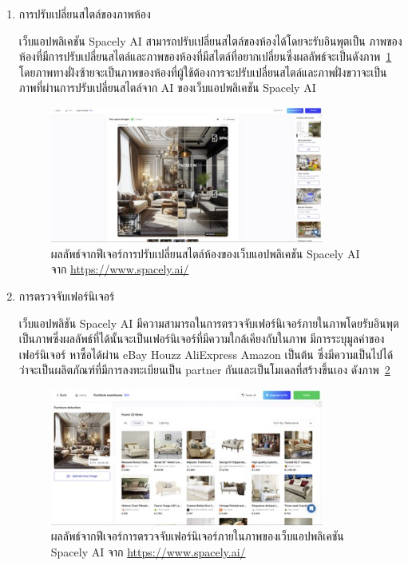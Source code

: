 \documentclass[12pt,oneside,openright,a4paper]{cpe-thai-project}
\begin{document}
\begin{enumerate}
\item การปรับเปลี่ยนสไตล์ของภาพห้อง   
\par \hspace {18pt} เว็บแอปพลิเคชัน Spacely AI สามารถปรับเปลี่ยนสไตล์ของห้องได้โดยจะรับอินพุตเป็น ภาพของห้องที่มีการปรับเปลี่ยนสไตล์และภาพของห้องที่มีสไตล์ที่อยากเปลี่ยนซึ่งผลลัพธ์จะเป็นดังภาพ~\ref{fig:spacely1-1} โดยภาพทางฝั่งซ้ายจะเป็นภาพของห้องที่ผู้ใช้ต้องการจะปรับเปลี่ยนสไตล์และภาพฝั่งขวาจะเป็นภาพที่ผ่านการปรับเปลี่ยนสไตล์จาก AI ของเว็บแอปพลิเคชัน Spacely AI

\begin{figure}[!h]\centering
\includegraphics[width=9cm]{image/spacely1-1.jpg}
\caption{ผลลัพธ์จากฟีเจอร์การปรับเปลี่ยนสไตล์ห้องของเว็บแอปพลิเคชัน Spacely AI จาก \url{https://www.spacely.ai/}}
\label{fig:spacely1-1}
\end{figure}

\item การตรวจจับเฟอร์นิเจอร์ 
\par \hspace {18pt} เว็บแอปพลิชัน Spacely AI มีความสามารถในการตรวจจับเฟอร์นิเจอร์ภายในภาพโดยรับอินพุตเป็นภาพซึ่งผลลัพธ์ที่ได้นั้นจะเป็นเฟอร์นิเจอร์ที่มีความใกล้เคียงกับในภาพ มีการระบุมูลค่าของเฟอร์นิเจอร์ หาซื้อได้ผ่าน eBay Houzz AliExpress Amazon เป็นต้น ซึ่งมีความเป็นไปได้ว่าจะเป็นผลิตภัณฑ์ที่มีการลงทะเบียนเป็น partner กันและเป็นโมเดลที่สร้างขึ้นเอง ดังภาพ~\ref{fig:spacely1-2}

\begin{figure}[!h]\centering
\includegraphics[width=9cm]{image/spacely1-2.jpg}
\caption{ผลลัพธ์จากฟีเจอร์การตรวจจับเฟอร์นิเจอร์ภายในภาพของเว็บแอปพลิเคชัน Spacely AI จาก \url{https://www.spacely.ai/}}
\label{fig:spacely1-2}
\end{figure}


\end{enumerate}
\end{document}
